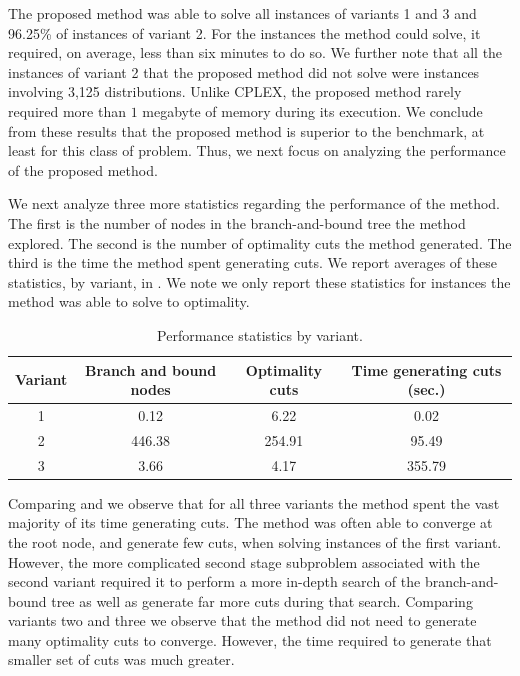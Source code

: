 \documentclass[12pt]{article}
\theoremstyle{thmstylethree}%
\begin{document}
 The proposed method was able to solve all instances of variants 1 and 3 and 96.25\% of instances of variant 2. For the instances the method could solve, it required, on average, less than six minutes to do so. We further note that all the instances of variant 2 that the proposed method did not solve were instances involving 3,125 distributions.  Unlike CPLEX, the proposed method rarely required more than $1$ megabyte of memory during its execution.  We conclude from these results that the proposed method is superior to the benchmark, at least for this class of problem. Thus, we next focus on analyzing the performance of the proposed method. 


We next analyze three more statistics regarding the performance of the method. The first is the number of nodes in the branch-and-bound tree the method explored. The second is the number of optimality cuts the method generated. The third is the time the method spent generating cuts. We report averages of these statistics, by variant, in  . We note we only report these statistics for instances the method was able to solve to optimality. 
\begin{table}[htp]
\centering
\caption{Performance statistics by variant.}
\label{tbl:perf_variant}
\begin{tabular}{cccc}
\toprule
Variant & Branch and bound nodes & Optimality cuts & Time generating cuts (sec.)\\
\midrule
 1 &  0.12  & 6.22 & 0.02 \\
 2 &  446.38  & 254.91 & 95.49 \\
 3 &  3.66 & 4.17 & 355.79 \\
\bottomrule
\end{tabular}
\end{table}

Comparing  and  we observe that for all three variants the method spent the vast majority of its time generating cuts.
The method was often able to converge at the root node, and generate few cuts, when solving instances of the first variant.
However, the more complicated second stage subproblem associated with the second variant required it to perform a more in-depth search of the branch-and-bound tree as well as generate far more cuts during that search.
Comparing variants two and three we observe that the method did not need to generate many optimality cuts to converge. However, the time required to generate that smaller set of cuts was much greater. 
\end{document}
